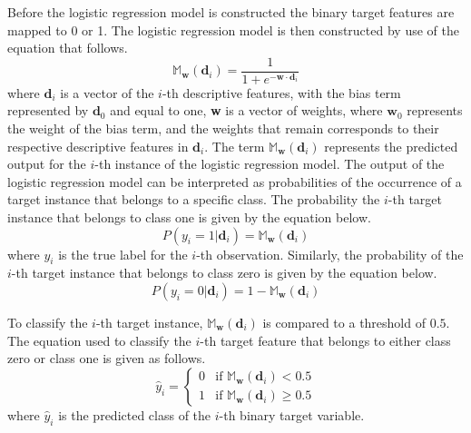 \documentclass[10pt, conference]{IEEEtran}
\begin{document}
Before the logistic regression model is constructed the binary target features are mapped to 0 or 1.
The logistic regression model is then constructed by use of the equation that follows.
\begin{equation}
    \mathbb{M}_{\textbf{w}}(\textbf{d}_i) = \frac{1}{1 + e^{-\textbf{w} \cdot \textbf{d}_i}} \label{eq: logistic_regression_equation}
\end{equation}
where $\textbf{d}_i$ is a vector of the $i$-th descriptive features, with the bias term represented by $\textbf{d}_0$ and equal to one,
\textbf{w} is a vector of weights, where $\textbf{w}_0$ represents the weight of the bias term, and the weights that remain corresponds
to their respective descriptive features in $\textbf{d}_i$. The term $\mathbb{M}_{\textbf{w}}(\textbf{d}_i)$ represents the predicted output
for the $i$-th instance of the logistic regression model. The output of the logistic regression model can be interpreted as probabilities
of the occurrence of a target instance that belongs to a specific class. The probability the $i$-th target instance that belongs to class one
is given by the equation below.
\begin{equation}
    P(y_i = 1|\textbf{d}_i) = \mathbb{M}_{\textbf{w}}(\textbf{d}_i) \label{eq: classified_class_1}
\end{equation}
where $y_i$ is the true label for the $i$-th observation. Similarly, the probability of the $i$-th target instance that belongs to class
zero is given by the equation below.
\begin{equation}
    P(y_i = 0|\textbf{d}_i) = 1 - \mathbb{M}_{\textbf{w}}(\textbf{d}_i) \label{eq: classified_class_0}
\end{equation}

To classify the $i$-th target instance, $\mathbb{M}_{\textbf{w}}(\textbf{d}_i)$ is compared to a threshold of $0.5$. The equation used
to classify the $i$-th target feature that belongs to either class zero or class one is given as follows.
\begin{equation}
    \hat{y}_i = 
    \begin{cases}
    0 & \text{if } \mathbb{M}_{\textbf{w}}(\textbf{d}_i) < 0.5 \\
    1 & \text{if } \mathbb{M}_{\textbf{w}}(\textbf{d}_i) \geq 0.5 
    \end{cases}
    \label{eq: classify_target_instance}
\end{equation}
where $\hat{y}_i$ is the predicted class of the $i$-th binary target variable.
\end{document}
